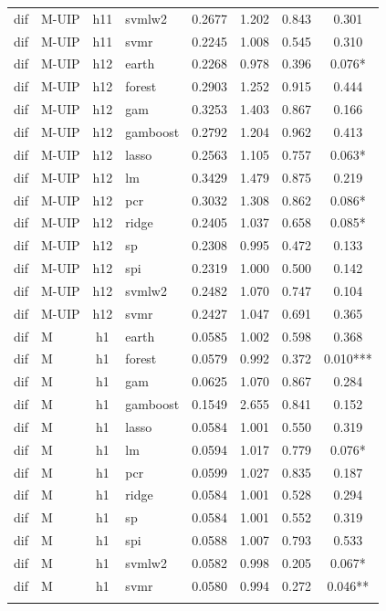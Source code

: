\begin{ThreePartTable}
\begin{longtable}[t]{llclcccc}
dif & M-UIP & h11 & svmlw2 & 0.2677 & 1.202 & 0.843 & 0.301\\
dif & M-UIP & h11 & svmr & 0.2245 & 1.008 & 0.545 & 0.310\\
\addlinespace
dif & M-UIP & h12 & earth & 0.2268 & 0.978 & 0.396 & 0.076*\\
dif & M-UIP & h12 & forest & 0.2903 & 1.252 & 0.915 & 0.444\\
dif & M-UIP & h12 & gam & 0.3253 & 1.403 & 0.867 & 0.166\\
dif & M-UIP & h12 & gamboost & 0.2792 & 1.204 & 0.962 & 0.413\\
dif & M-UIP & h12 & lasso & 0.2563 & 1.105 & 0.757 & 0.063*\\
dif & M-UIP & h12 & lm & 0.3429 & 1.479 & 0.875 & 0.219\\
dif & M-UIP & h12 & pcr & 0.3032 & 1.308 & 0.862 & 0.086*\\
dif & M-UIP & h12 & ridge & 0.2405 & 1.037 & 0.658 & 0.085*\\
dif & M-UIP & h12 & sp & 0.2308 & 0.995 & 0.472 & 0.133\\
dif & M-UIP & h12 & spi & 0.2319 & 1.000 & 0.500 & 0.142\\
dif & M-UIP & h12 & svmlw2 & 0.2482 & 1.070 & 0.747 & 0.104\\
dif & M-UIP & h12 & svmr & 0.2427 & 1.047 & 0.691 & 0.365\\
\addlinespace
dif & M & h1 & earth & 0.0585 & 1.002 & 0.598 & 0.368\\
dif & M & h1 & forest & 0.0579 & 0.992 & 0.372 & 0.010***\\
dif & M & h1 & gam & 0.0625 & 1.070 & 0.867 & 0.284\\
dif & M & h1 & gamboost & 0.1549 & 2.655 & 0.841 & 0.152\\
dif & M & h1 & lasso & 0.0584 & 1.001 & 0.550 & 0.319\\
dif & M & h1 & lm & 0.0594 & 1.017 & 0.779 & 0.076*\\
dif & M & h1 & pcr & 0.0599 & 1.027 & 0.835 & 0.187\\
dif & M & h1 & ridge & 0.0584 & 1.001 & 0.528 & 0.294\\
dif & M & h1 & sp & 0.0584 & 1.001 & 0.552 & 0.319\\
dif & M & h1 & spi & 0.0588 & 1.007 & 0.793 & 0.533\\
dif & M & h1 & svmlw2 & 0.0582 & 0.998 & 0.205 & 0.067*\\
dif & M & h1 & svmr & 0.0580 & 0.994 & 0.272 & 0.046**\\
\addlinespace

\end{longtable}
\end{ThreePartTable}
